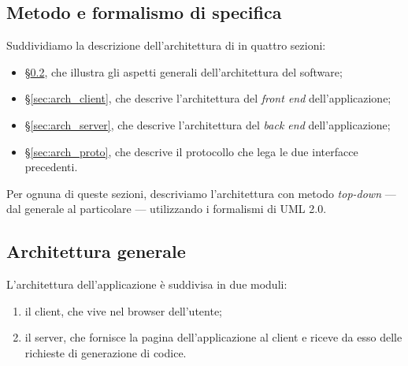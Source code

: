 


\subsection{Metodo e formalismo di specifica}
Suddividiamo la descrizione dell'architettura di \proj{} in quattro sezioni:
\begin{itemize}
	\item §\ref{sec:arch_gen}, che illustra gli aspetti generali dell'architettura del software;
	\item §\ref{sec:arch_client}, che descrive l'architettura del \emph{front end} dell'applicazione;
	\item §\ref{sec:arch_server}, che descrive l'architettura del \emph{back end} dell'applicazione;
	\item §\ref{sec:arch_proto}, che descrive il protocollo che lega le due interfacce precedenti.
\end{itemize}
Per ognuna di queste sezioni, descriviamo l'architettura con metodo \emph{top-down} --- dal generale al particolare --- utilizzando i formalismi di UML 2.0.



\subsection{Architettura generale} \label{sec:arch_gen}
L'architettura dell'applicazione è suddivisa in due moduli:
\begin{enumerate}
	\item il client, che vive nel browser dell'utente;
	\item il server, che fornisce la pagina dell'applicazione al client e riceve da esso delle richieste di generazione di codice.
\end{enumerate}

